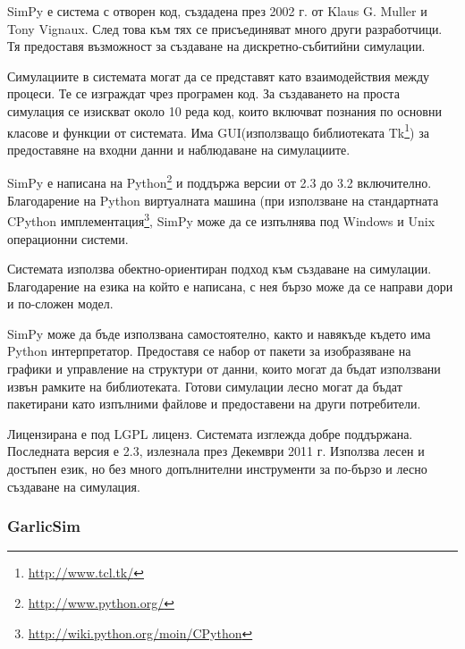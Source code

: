 			SimPy е система с отворен код, създадена през 2002 г. от Klaus G. Muller и Tony Vignaux. След това
			към тях се присъединяват много други разработчици. 
			Тя предоставя възможност за създаване на дискретно-събитийни симулации.
			
			
				Симулациите в системата могат да се представят като взаимодействия между процеси. Те се изграждат чрез
				програмен код. За създаването на проста симулация се изискват около 10 реда код, 
				които включват познания по основни класове и функции от системата. Има GUI(използващо библиотеката 
				Tk\footnote{\url{http://www.tcl.tk/}}) за предоставяне на входни данни и наблюдаване на симулациите.						
			
			
				SimPy е написана на Python\footnote{\url{http://www.python.org/}} и поддържа версии от 2.3 до 3.2 включително.
				Благодарение на Python виртуалната машина (при използване на стандартната CPython 
				имплементация\footnote{\url{http://wiki.python.org/moin/CPython}}, SimPy може да се изпълнява под 
				Windows и Unix операционни системи.
			
			
				Системата използва обектно-ориентиран подход към създаване на симулации. Благодарение на езика на който е
				написана, с нея бързо може да се направи дори и по-сложен модел.
			
						
				SimPy може да бъде използвана самостоятелно, както и навякъде където има Python интерпретатор.
				Предоставя се набор от пакети за изобразяване на графики и управление на структури от данни, които могат
				да бъдат използвани извън рамките на библиотеката. Готови симулации лесно могат да бъдат пакетирани
				като изпълними файлове и предоставени на други потребители.

			
				Лицензирана е под LGPL лиценз. Системата изглежда добре поддържана. Последната версия е 2.3, излезнала през 
				Декември 2011 г. Използва лесен и достъпен език, но без много допълнителни инструменти за по-бързо и лесно
				създаване на симулация. \cite{SimPy}
				
		\subsubsection{GarlicSim}			
			
